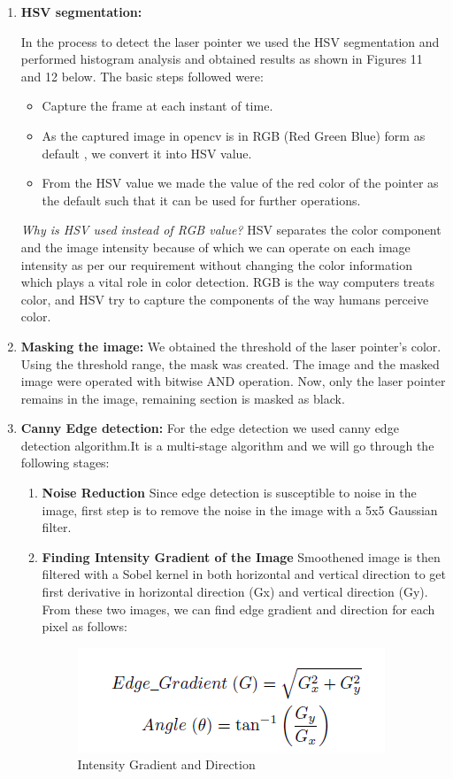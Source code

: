 \documentclass[12pt, a4paper]{article}
\begin{document}
\begin{enumerate}
	\item \textbf{HSV segmentation:}

	In the process to detect the laser pointer we used the HSV segmentation and performed histogram analysis and obtained results as shown in Figures 11 and 12 below.
	The basic steps followed were:
	\begin{itemize}
	\item Capture the frame at each instant of time.
	\item As the captured image in opencv is in RGB (Red Green Blue) form as default , we convert it into HSV value.
	\item From the HSV value we made the value of the red color of the pointer as the default such that it can be used for further operations.
	\end{itemize}
	\emph {Why is HSV used instead of RGB value?}
	HSV separates the color component and the image intensity because of which we can operate on each image intensity as per our requirement without changing the color information which plays a vital role in color detection. RGB is the way computers treats color, and HSV try to capture the components of the way humans perceive color.   
	\item \textbf{Masking the image:}
		We obtained the threshold of the laser pointer’s color. Using the threshold range, the mask was created. The image and the masked image were operated with bitwise AND operation. Now, only the laser pointer remains in the image, remaining section is masked as black.

	\item \textbf{Canny Edge detection:}
For the edge detection we used canny edge detection algorithm.It is a multi-stage algorithm and we will go through the following stages:
\begin{enumerate}
\item \textbf {Noise Reduction}
Since edge detection is susceptible to noise in the image, first step is to remove the noise in the image with a 5x5 Gaussian filter.
\item \textbf{Finding Intensity Gradient of the Image}
Smoothened image is then filtered with a Sobel kernel in both horizontal and vertical direction to get first derivative in horizontal direction (Gx) and vertical direction (Gy). From these two images, we can find edge gradient and direction for each pixel as follows:
\begin{figure}[htp]
\centering
\includegraphics[scale=0.7]{canny.png}
\caption{Intensity Gradient and Direction}
\label{}
\end{figure}


\end{enumerate}
\end{enumerate}
\end{document}
